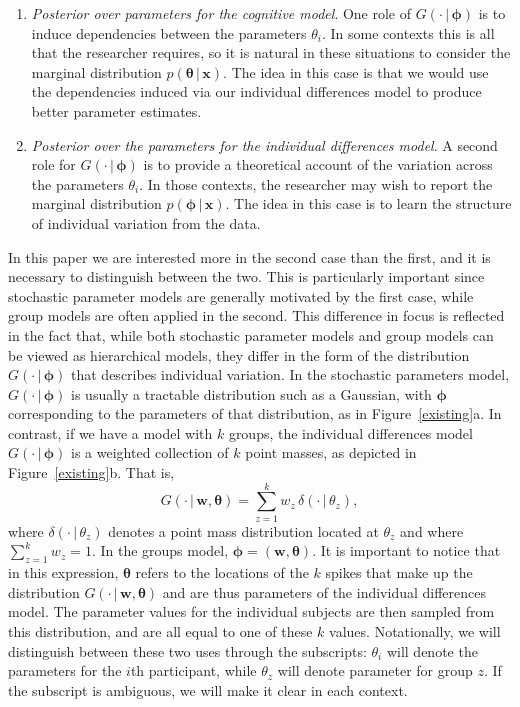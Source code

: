 \documentclass[authoryear]{elsarticle}
\newcommand{\condon}{\,|\,}
\newcommand{\vctr}[1]{\bm{#1}}
\newcommand{\panel}[1]{#1}
\begin{document}
\begin{enumerate}
\item {\it Posterior over parameters for the cognitive model}. One role of $G(\cdot \condon \vctr{\phi})$
is to induce dependencies between the parameters $\theta_i$. In some contexts
this is all that the researcher requires, so it is natural in these situations to
consider the marginal distribution $p(\vctr{\theta} \condon \vctr{x})$. The idea
in this case is that we would use the dependencies induced via our individual
differences model to produce better parameter estimates.
\item {\it Posterior over the parameters for the individual differences model}. A second role for
$G(\cdot \condon \vctr{\phi})$ is to provide a theoretical account of the
variation across the parameters $\theta_i$. In those contexts, the researcher
may wish to report the marginal distribution $p(\vctr{\phi} \condon \vctr{x})$.
The idea in this case is to learn the structure of individual variation from the data.
\end{enumerate}

In this paper we are interested more in the second case than the first, and
it is necessary to distinguish between the two. This is particularly important
since stochastic parameter models are generally motivated by the first
case, while group models are often applied
in the second. This difference in focus is reflected in the fact that, while
 both stochastic parameter models and group models can be viewed
as hierarchical models, they differ in the form of the distribution $G(\cdot
\condon \vctr{\phi})$ that describes individual variation. In the stochastic
parameters model, $G(\cdot \condon \vctr{\phi})$ is usually a tractable
distribution such as a Gaussian, with $\vctr{\phi}$ corresponding to
the parameters of that distribution, as in Figure~\ref{existing}\panel{a}.
In contrast, if we have a model with $k$ groups, the individual differences
model $G(\cdot \condon \vctr{\phi})$ is a weighted collection of
$k$ point masses, as depicted in Figure~\ref{existing}\panel{b}. That is,
\begin{equation}\label{finitegroups}
        G(\cdot \condon \vctr{w},\vctr{\theta}) = \sum_{z=1}^k w_z \,
        \delta(\cdot \condon \theta_z),
\end{equation}
where $\delta(\cdot \condon \theta_z)$ denotes a point mass distribution
located at $\theta_z$ and where $\sum_{z=1}^k w_z =1$. In the groups
model, $\vctr{\phi} = (\vctr{w},\vctr{\theta})$. It is important to notice
that in this expression, $\vctr{\theta}$ refers to the locations of the $k$
spikes that make up the distribution $G(\cdot \condon \vctr{w},\vctr{\theta})$
and are thus parameters of the individual differences model. The parameter
values for the individual subjects are then sampled from this distribution,
and are all equal to one of these $k$ values. Notationally, we will distinguish
between these two uses through the subscripts: $\theta_i$ will denote the
parameters for the $i$th participant, while $\theta_z$ will denote parameter for
group $z$. If the subscript is ambiguous, we will make it clear in each context.
\end{document}
